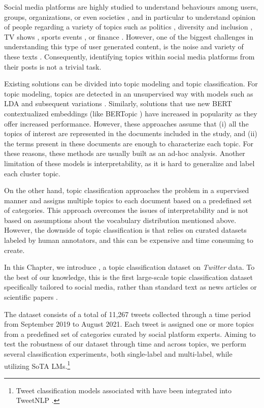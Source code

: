 Social media platforms are highly studied to understand behaviours among users, groups, organizations, or even societies \cite{Yang_Wang_Pierce_Vaish_Shi_Shah_2021}, and in particular to understand opinion of people regarding a variety of topics such as politics \cite{zhuravskaya2020political}, diversity and inclusion \cite{chakravarthi2020hopeedi}, TV shows \cite{wohn2011tweeting}, sports events \cite{lim2015social}, or finance \cite{hu2021rise}.
However, one of the biggest challenges in understanding this type of user generated content, is the noise and variety of these texts \cite{morgan2014information,baldwin2013noisy}. Consequently, identifying topics within social media platforms from their posts is not a trivial task.

Existing solutions can be divided into topic modeling and topic classification. For topic modeling, topics are detected in an unsupervised way with models such as \ac{LDA} \cite{lda} and subsequent variations \cite{steyvers2007probabilistic}. 
Similarly, solutions that use new BERT contextualized embeddings (like BERTopic \cite{bertopic}) have increased in popularity as they offer increased performance. 
However, these approaches assume that (i) all the topics of interest are represented in the documents included in the study, and (ii) the terms present in these documents are enough to characterize each topic. For these reasons, these methods are usually built as an ad-hoc analysis.  Another limitation of these models is interpretability, as it is hard to generalize and label each cluster topic.

On the other hand, topic classification approaches the problem in a supervised manner and assigns multiple topics to each document based on a predefined set of categories. This approach overcomes the issues of interpretability and is not based on assumptions about the vocabulary distribution mentioned above. However, the downside of topic classification is that relies on curated datasets labeled by human annotators, and this can be expensive and time consuming to create.

In this Chapter, we introduce \TweetTopic, a topic classification dataset on \textit{Twitter} data. To the best of our knowledge, this is the first large-scale topic classification dataset specifically tailored to social media, rather than standard text as news articles \cite{greene2006practical} or scientific papers \cite{lazaridou2021mind}. 

The dataset consists of a total of 11,267 tweets collected through a time period from September 2019 to August 2021. Each tweet is assigned one or more topics from a predefined set of categories curated by social platform experts. Aiming to test the robustness of our dataset through time and across topics, we perform several classification experiments, both single-label and multi-label, while utilizing \ac{SoTA} \acp{LM}.\footnote{Tweet classification models associated with \TweetTopic have been integrated into TweetNLP \cite{camacho2022tweetnlp}.} 

